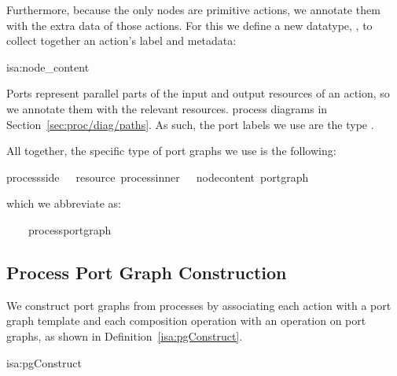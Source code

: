 \documentclass[class=smolathesis,crop=false]{standalone}
\begin{document}
Furthermore, because the only nodes are primitive actions, we annotate them with the extra data of those actions.
For this we define a new datatype, , to collect together an action's label and metadata:
\begin{isadef}{isa:node_content}
  
\end{isadef}

Ports represent parallel parts of the input and output resources of an action, so we annotate them with the relevant resources.
 process diagrams in Section~\ref{sec:proc/diag/paths}.
As such, the port labels we use are the type .

All together, the specific type of port graphs we use is the following:
\begin{isabelle}
\centering
  {\isacharparenleft}process{\isacharunderscore}side{\isacharcomma}\ {\isacharparenleft}\ \ resource{\isacharcomma}\ process{\isacharunderscore}inner{\isacharcomma}\ {\isacharparenleft}\ \ node{\isacharunderscore}content{\isacharparenright}\ port{\isacharunderscore}graph
\end{isabelle}
which we abbreviate as:
\begin{isabelle}
\centering
  {\isacharparenleft}\ \ \ \ process{\isacharunderscore}port{\isacharunderscore}graph
\end{isabelle}

\subsection{Process Port Graph Construction}
\label{sec:port_graphs/process/constr}

We construct port graphs from processes by associating each action with a port graph template and each composition operation with an operation on port graphs, as shown in Definition~\ref{isa:pgConstruct}.

\begin{isadef}{isa:pgConstruct}
  
\end{isadef}
\end{document}
